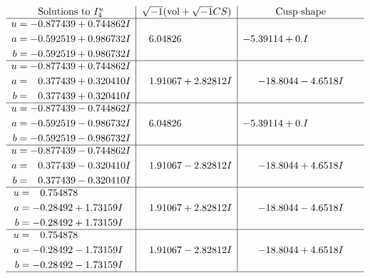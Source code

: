 \documentclass[1p]{elsarticle_modified}
\theoremstyle{definition}
\newcommand{\I}{\sqrt{-1}}
\begin{document}
$$\begin{array}{c|c|c}  
\text{Solutions to }I^u_{4}& \I (\text{vol} + \sqrt{-1}CS) & \text{Cusp shape}\\
 \hline 
\begin{aligned}
u &= -0.877439 + 0.744862 I \\
a &= -0.592519 + 0.986732 I \\
b &= -0.592519 + 0.986732 I\end{aligned}
 & \phantom{-}6.04826\phantom{ +0.000000I} & -5.39114 + 0. I\phantom{ +0.000000I} \\ \hline\begin{aligned}
u &= -0.877439 + 0.744862 I \\
a &= \phantom{-}0.377439 + 0.320410 I \\
b &= \phantom{-}0.377439 + 0.320410 I\end{aligned}
 & \phantom{-}1.91067 + 2.82812 I & -18.8044 - 4.6518 I \\ \hline\begin{aligned}
u &= -0.877439 - 0.744862 I \\
a &= -0.592519 - 0.986732 I \\
b &= -0.592519 - 0.986732 I\end{aligned}
 & \phantom{-}6.04826\phantom{ +0.000000I} & -5.39114 + 0. I\phantom{ +0.000000I} \\ \hline\begin{aligned}
u &= -0.877439 - 0.744862 I \\
a &= \phantom{-}0.377439 - 0.320410 I \\
b &= \phantom{-}0.377439 - 0.320410 I\end{aligned}
 & \phantom{-}1.91067 - 2.82812 I & -18.8044 + 4.6518 I \\ \hline\begin{aligned}
u &= \phantom{-}0.754878\phantom{ +0.000000I} \\
a &= -0.28492 + 1.73159 I \\
b &= -0.28492 + 1.73159 I\end{aligned}
 & \phantom{-}1.91067 + 2.82812 I & -18.8044 - 4.6518 I \\ \hline\begin{aligned}
u &= \phantom{-}0.754878\phantom{ +0.000000I} \\
a &= -0.28492 - 1.73159 I \\
b &= -0.28492 - 1.73159 I\end{aligned}
 & \phantom{-}1.91067 - 2.82812 I & -18.8044 + 4.6518 I\\
 \hline 
 \end{array}$$\newpage
\end{document}
